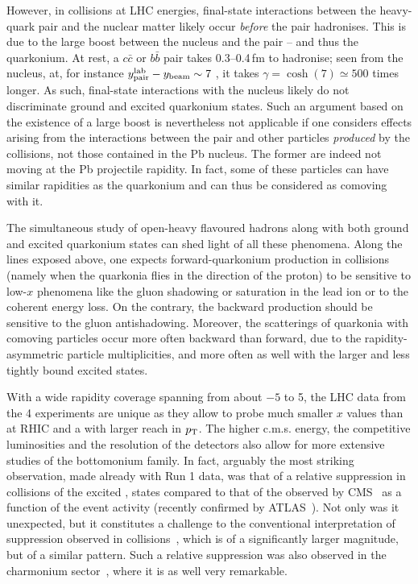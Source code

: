 \documentclass[../report.tex]{subfiles}
\begin{document}
However, in \pPb collisions at LHC energies, final-state interactions between the heavy-quark pair and the nuclear matter likely occur {\it before} the pair hadronises. This is due to the large boost between the nucleus and the pair -- and thus the quarkonium. At rest, a $c \bar c$ or $b\bar b$ pair takes 0.3--0.4\,fm to hadronise; seen from the nucleus, at, for instance $y^{\rm lab}_{\rm pair}-y_{\rm beam} \sim 7$ , it takes $\gamma=\cosh(7) \simeq 500$ times longer. As such, final-state interactions with the nucleus likely do not discriminate ground and excited quarkonium states. Such an argument based on the existence of a large boost is nevertheless not applicable if one considers effects arising from the interactions between the pair and other particles {\it produced} by the \pPb collisions, not those contained in the Pb nucleus. The former are indeed not moving at the Pb projectile rapidity. In fact, some of these particles can have similar rapidities as the quarkonium and can thus be considered as comoving with it.
 
The simultaneous study of open-heavy flavoured hadrons along with both ground and excited quarkonium states can shed light of all these phenomena. Along the lines exposed above, one expects forward-quarkonium production in \pPb collisions (namely when the quarkonia flies in the direction of the proton) to be sensitive to low-$x$ phenomena like the gluon shadowing or saturation in the lead ion or to the coherent energy loss. On the contrary, the backward production should be sensitive to the gluon antishadowing. Moreover, the scatterings of quarkonia with comoving particles occur more often backward than forward, due to the rapidity-asymmetric particle multiplicities, and more often as well with the larger and less tightly bound excited states. 
   
With a wide rapidity coverage spanning from about $-5$ to 5, the LHC data from the 4 experiments are unique as they allow to probe much smaller $x$ values than at RHIC and a with larger reach in $p\sb{\scriptstyle\mathrm{T}}$. The higher c.m.s. energy, the competitive luminosities and the resolution of the detectors also allow for more extensive studies of the bottomonium family. In fact, arguably the most striking observation, made already with Run 1 data, was that of a relative suppression in \pPb collisions of the excited , states compared to that of the  observed by CMS~\cite{Chatrchyan:2013nza} as a function of the event activity (recently confirmed by ATLAS~\cite{Aaboud:2017cif}). Not only was it unexpected, but it constitutes a challenge to the conventional interpretation of suppression observed in \PbPb collisions~\cite{Chatrchyan:2012lxa}, which is of a significantly larger magnitude, but of a similar pattern. Such a relative suppression was also observed in the charmonium sector~\cite{Abelev:2014zpa}, where it is as well very remarkable.
\end{document}
